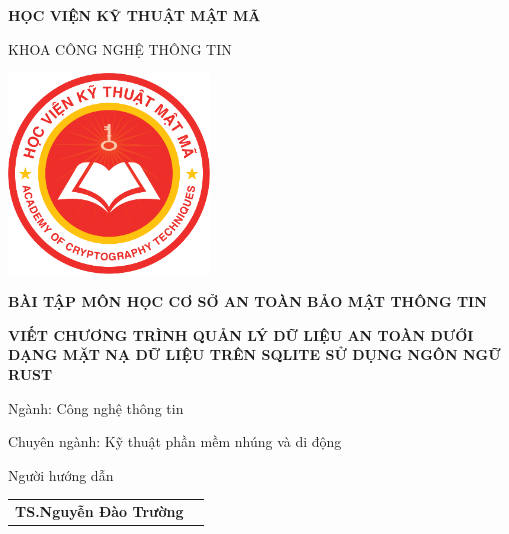 \begin{titlepage}

    \begin{center}
    
        \textbf{HỌC VIỆN KỸ THUẬT MẬT MÃ}
        
        KHOA CÔNG NGHỆ THÔNG TIN
        
       \vspace{1cm}

        \includegraphics[width=0.4\textwidth]{images/kma.png}


       \vspace{2.2cm}

        \textbf{BÀI TẬP MÔN HỌC CƠ SỞ AN TOÀN BẢO MẬT THÔNG TIN}

        \vspace{0.2cm}

        \color{red}
        \textbf{VIẾT CHƯƠNG TRÌNH QUẢN LÝ DỮ LIỆU AN TOÀN DƯỚI DẠNG MẶT NẠ DỮ LIỆU TRÊN SQLITE SỬ DỤNG NGÔN NGỮ RUST}



    \end{center}

    \begin{flushleft}        
        \hspace{3cm}
        Ngành: Công nghệ thông tin
        
        \hspace{3cm}
        Chuyên ngành: Kỹ thuật phần mềm nhúng và di động


        \vfill
        
        \hspace{3cm}

        \hspace{3cm}Người hướng dẫn

        \begin{tabular}{l c}

        \hspace{4cm}\textbf{TS.Nguyễn Đào Trường} \\
        

\end{tabular}
\end{flushleft}
\end{titlepage}
